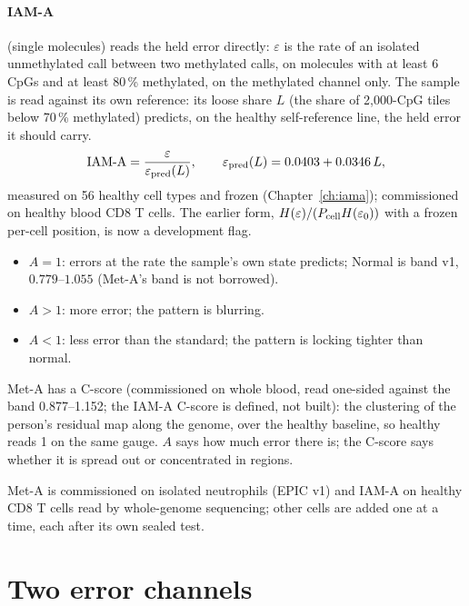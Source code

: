 \paragraph{IAM-A} (single molecules) reads the held error directly: $\varepsilon$ is the rate of an isolated unmethylated call between two
methylated calls, on molecules with at least 6 CpGs and at least 80\,\% methylated, on the methylated channel only. The sample is read against its own reference: its loose share $L$ (the share of 2,000-CpG tiles below 70\,\% methylated) predicts, on the healthy self-reference line, the held error it should carry.
\begin{equation}\text{IAM-A}=\frac{\varepsilon}{\varepsilon_{\rm pred}(L)},\qquad \varepsilon_{\rm pred}(L)=0.0403+0.0346\,L,\end{equation}
measured on 56 healthy cell types and frozen (Chapter~\ref{ch:iama}); commissioned on healthy blood CD8 T cells. The earlier form, $H(\varepsilon)/(P_{\rm cell}H(\varepsilon_0))$ with a frozen per-cell position, is now a development flag.
\begin{itemize}
\item $A=1$: errors at the rate the sample's own state predicts; Normal is band v1, $0.779$--$1.055$ (Met-A's band is not borrowed).
\item $A>1$: more error; the pattern is blurring.
\item $A<1$: less error than the standard; the pattern is locking tighter than normal.
\end{itemize}
Met-A has a C-score (commissioned on whole blood, read one-sided against the band 0.877--1.152; the IAM-A C-score is defined, not built): the clustering of the person's residual map along the genome, over the healthy baseline, so healthy reads 1 on the same
gauge. $A$ says how much error there is; the C-score says whether it is spread out or concentrated in regions.

Met-A is commissioned on isolated neutrophils (EPIC v1) and IAM-A on healthy CD8 T cells read by whole-genome sequencing; other cells are added one at a time, each after its own sealed test.

\section{Two error channels}

